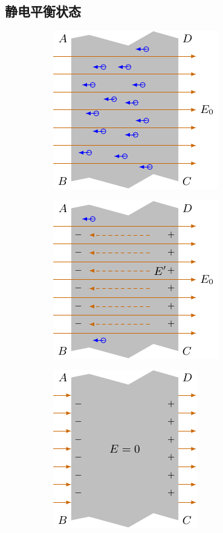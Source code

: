 \subsection{静电平衡状态} 
\begin{figure}[htbp]
    \centering
    \begin{subfigure}{0.32\linewidth}
        \centering
        \includegraphics{fig/B/6-12a.pdf}
        \caption{}\label{fig_B_6-12a}
    \end{subfigure}
    \hfil
    \begin{subfigure}{0.32\linewidth}
        \centering
        \includegraphics{fig/B/6-12b.pdf}
        \caption{}\label{fig_B_6-12b}
    \end{subfigure}
    \hfil
    \begin{subfigure}{0.32\linewidth}
        \centering
        \includegraphics{fig/B/6-12c.pdf}
        \caption{}\label{fig_B_6-12c}
    \end{subfigure}
    \caption{}\label{fig_B_6-12}
\end{figure}

